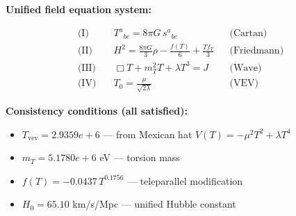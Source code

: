 
\textbf{Unified field equation system:}

\begin{align}
  \text{(I)} \quad & T^a{}_{bc} = 8\pi G \, s^a{}_{bc} && \text{(Cartan)} \\
  \text{(II)} \quad & H^2 = \frac{8\pi G}{3}\rho - \frac{f(T)}{6} + \frac{Tf_T}{3} && \text{(Friedmann)} \\
  \text{(III)} \quad & \Box T + m_T^2 T + \lambda T^3 = J && \text{(Wave)} \\
  \text{(IV)} \quad & T_0 = \frac{\mu}{\sqrt{2\lambda}} && \text{(VEV)}
\end{align}

\textbf{Consistency conditions (all satisfied):}
\begin{itemize}
  \item $T_{\text{vev}} = 2.9359e+6$ — from Mexican hat $V(T) = -\mu^2 T^2 + \lambda T^4$
  \item $m_T = 5.1780e+6$ eV — torsion mass
  \item $f(T) = -0.0437 \, T^{0.1756}$ — teleparallel modification
  \item $H_0 = 65.10$ km/s/Mpc — unified Hubble constant
\end{itemize}